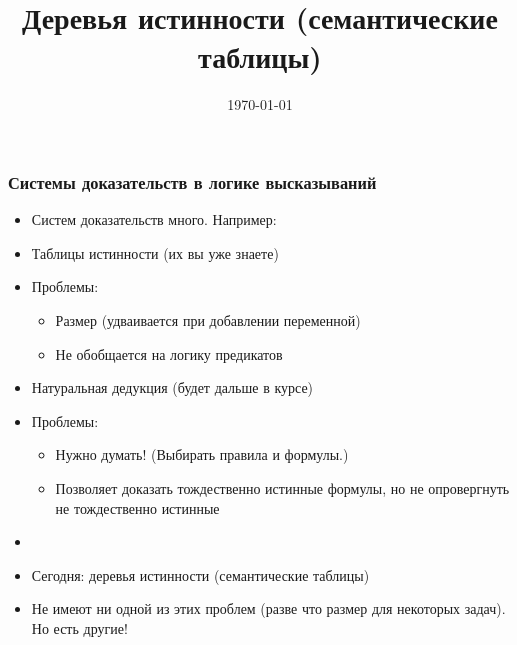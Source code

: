 \documentclass[10pt]{beamer}
\title{Деревья истинности (семантические таблицы)}
\date{\today}
\begin{document}
\begin{frame}[plain]
\maketitle
\end{frame}

\begin{frame}
\frametitle{Системы доказательств в логике высказываний}
\begin{itemize}
    \item Систем доказательств много. Например:
    \pause
    \item Таблицы истинности (их вы уже знаете)
    \item[] Проблемы:
    \pause
    \begin{itemize}
        \item Размер (удваивается при добавлении переменной)
        \item Не обобщается на логику предикатов
    \end{itemize}
    \pause
    \item Натуральная дедукция (будет дальше в курсе)
    \item[] Проблемы:
    \pause
    \begin{itemize}
        \item Нужно думать! (Выбирать правила и формулы.)
        \item Позволяет доказать тождественно истинные формулы, но не опровергнуть не тождественно истинные
    \end{itemize}
    \item[]
    \item Сегодня: деревья истинности (семантические таблицы)
    \item Не имеют ни одной из этих проблем (разве что размер для некоторых задач). Но есть другие!
\end{itemize}
\end{frame}
\end{document}
